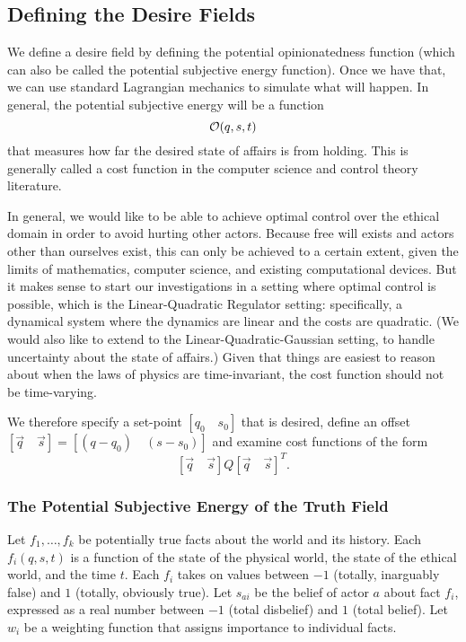 \documentclass{article}
\begin{document}
\subsection{Defining the Desire Fields}

We define a desire field by defining the potential opinionatedness
function (which can also be called the potential subjective energy
function). Once we have that, we can use standard Lagrangian mechanics
to simulate what will happen. In general, the potential subjective
energy will be a function $${\mathcal O}(q, s, t)$$ that measures how far the
desired state of affairs is from holding. This is generally called a
cost function in the computer science and control theory literature.

In general, we would like to be able to achieve optimal control over
the ethical domain in order to avoid hurting other actors. Because
free will exists and actors other than ourselves exist, this can only
be achieved to a certain extent, given the limits of mathematics,
computer science, and existing computational devices. But it makes
sense to start our investigations in a setting where optimal control
is possible, which is the Linear-Quadratic Regulator setting:
specifically, a dynamical system where the dynamics are linear and the
costs are quadratic. (We would also like to extend to the
Linear-Quadratic-Gaussian setting, to handle uncertainty about the
state of affairs.) Given that things are easiest to reason about when
the laws of physics are time-invariant, the cost function should not
be time-varying.

We therefore specify a set-point $[q_0 \quad s_0]$ that is desired,
define an offset $[\vec{q} \quad \vec{s}] = [(q - q_0) \quad (s -
  s_0)]$ and examine cost functions of the form
$$[\vec{q} \quad \vec{s}] Q [\vec{q} \quad \vec{s}]^T.$$

\subsubsection{The Potential Subjective Energy of the Truth Field}

Let $f_1, \dots, f_k$ be potentially true facts about the world and
its history. Each $f_i(q, s, t)$ is a function of the state of the
physical world, the state of the ethical world, and the time $t$. Each
$f_i$ takes on values between $-1$ (totally, inarguably false) and $1$
(totally, obviously true). Let $s_{ai}$ be the belief of actor $a$
about fact $f_i$, expressed as a real number between $-1$ (total
disbelief) and $1$ (total belief). Let $w_i$ be a weighting function
that assigns importance to individual facts.
\end{document}
